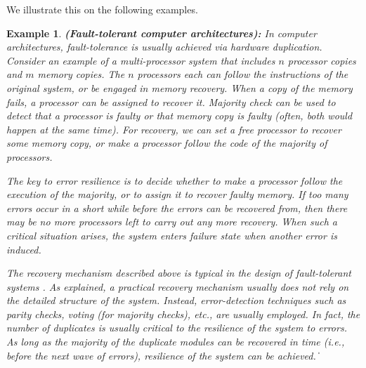 \documentclass[times,10pt,twocolumn]{article}
\newtheorem{example}[theorem]{Example}
\newcommand\qed{\hfill\ensuremath{\Box}}
\def\qed{\ifmmode\|\else{\unskip\nobreak\hfil
\penalty50\hskip1em\null\nobreak\hfil$\blacksquare$
\parfillskip=0pt\finalhyphendemerits=0\endgraf}\fi}
\begin{document}
We illustrate this on the following examples.  

\begin{example} 
{\bf (Fault-tolerant computer architectures):}  
\label{exmp.avi}
In computer architectures, 
fault-tolerance is usually achieved via hardware duplication.  
Consider an example of a multi-processor system that
includes $n$ processor copies and $m$ memory copies.  
The $n$ processors each can follow the instructions
of the original system, or be engaged in memory recovery. 
When a copy of the memory fails, a processor can be assigned to recover it.
Majority check can be used to detect that a processor is faulty
or that memory copy is faulty\label{reply2.defected} (often, both would happen at the same time). 
For recovery, we can set a free processor to recover some memory copy, or
make a processor follow the code of the majority of processors.

The key to error resilience is to decide whether to make
a processor follow the execution of the majority, or to
assign it to recover faulty memory. 
If too many errors occur in a short while before 
the errors can be recovered from, 
then there may be no more processors left to carry out any more recovery. 
When such a critical situation arises, the system enters failure state when another error is induced.  

The recovery mechanism described\label{reply2.in.the.above} above is typical in 
the design of fault-tolerant systems \cite{Pradhan96}.  
As explained, a practical recovery mechanism usually 
does not rely on the detailed structure of the system.  
Instead, error-detection 
techniques such as parity checks, voting (for majority checks), 
etc., are usually employed.  
In fact, the number of duplicates is usually\label{reply2.usually.is} critical to the 
resilience of the system to errors. 
As long as the majority of the duplicate modules can be recovered 
in time (i.e., before the\label{reply2.the.next} next wave of errors), 
resilience of the system can be achieved. 
\qed 
\end{example} 
\end{document}
